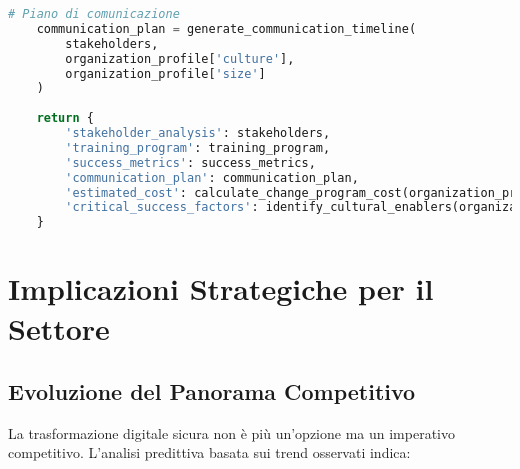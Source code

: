 \begin{lstlisting}[language=Python, caption=Programma change management GDO]
    # Piano di comunicazione
    communication_plan = generate_communication_timeline(
        stakeholders,
        organization_profile['culture'],
        organization_profile['size']
    )
    
    return {
        'stakeholder_analysis': stakeholders,
        'training_program': training_program,
        'success_metrics': success_metrics,
        'communication_plan': communication_plan,
        'estimated_cost': calculate_change_program_cost(organization_profile),
        'critical_success_factors': identify_cultural_enablers(organization_profile)
    }
\end{lstlisting}

\section{Implicazioni Strategiche per il Settore}

\subsection{Evoluzione del Panorama Competitivo}

La trasformazione digitale sicura non è più un'opzione ma un imperativo competitivo. L'analisi predittiva basata sui trend osservati indica:

